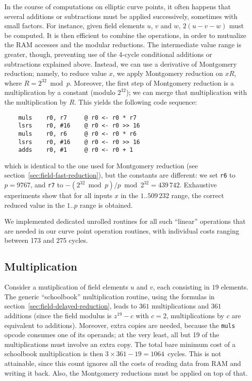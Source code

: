 \documentclass{llncs}
\begin{document}
In the course of computations on elliptic curve points, it often happens
that several additions or subtractions must be applied successively,
sometimes with small factors. For instance, given field elements $u$,
$v$ and $w$, $2(u - v - w)$ must be computed. It is then efficient to
combine the operations, in order to mutualize the RAM accesses and the
modular reductions. The intermediate value range is greater, though,
preventing use of the 4-cycle conditional additions or subtractions
explained above. Instead, we can use a derivative of Montgomery
reduction; namely, to reduce value $x$, we apply Montgomery reduction on
$xR$, where $R = 2^{32} \bmod p$. Moreover, the first step of Montgomery
reduction is a multiplication by a constant (modulo $2^{32}$); we can
merge that multiplication with the multiplication by $R$. This yields
the following code sequence:
\begin{verbatim}
    muls    r0, r7     @ r0 <- r0 * r7
    lsrs    r0, #16    @ r0 <- r0 >> 16
    muls    r0, r6     @ r0 <- r0 * r6
    lsrs    r0, #16    @ r0 <- r0 >> 16
    adds    r0, #1     @ r0 <- r0 + 1
\end{verbatim}
which is identical to the one used for Montgomery reduction (see
section~\ref{sec:field-fast-reduction}), but the constants are
different: we set \verb+r6+ to $p = 9767$, and \verb+r7+ to $-(2^{32}
\bmod p)/p \bmod 2^{32} = 439\,742$. Exhaustive experiments show that
for all inputs $x$ in the $1$..$509\,232$ range, the correct reduced
value in the $1$..$p$ range is obtained.

We implemented dedicated unrolled routines for all such ``linear''
operations that are needed in our curve point operation routines, with
individual costs ranging between 173 and 275 cycles.

\subsection{Multiplication}\label{sec:field-ops-mul}

Consider a mutiplication of field elements $u$ and $v$, each consisting
in $19$ elements. The generic ``schoolbook'' multiplication routine,
using the formulas in section~\ref{sec:field-delayed-reduction}, leads
to $361$ multiplications and $361$ additions (since the field modulus is
$z^{19}-c$ with $c = 2$, multiplications by $c$ are equivalent to
additions). Moreover, extra copies are needed, because the \verb+muls+
opcode consumes one of its operands; at the very least, all but 19 of
the multiplications must involve an extra copy. The total bare minimum
cost of a schoolbook multiplication is then $3\times 361 - 19 =
1064$~cycles. This is not attainable, since this count ignores all the
costs of reading data from RAM and writing it back. Also, the Montgomery
reductions must be applied on top of that.
\end{document}
